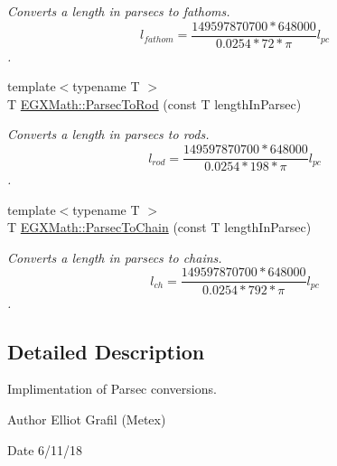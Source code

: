 \begin{DoxyCompactItemize}
\begin{DoxyCompactList}\small\item\em Converts a length in parsecs to fathoms. \[ l_{fathom}= \frac{149597870700 * 648000}{0.0254 * 72 * \pi} l_{pc} \]. \end{DoxyCompactList}\item 
{\footnotesize template$<$typename T $>$ }\\T \mbox{\hyperlink{group___e_g_x_math-_conversions-_length_conversions-_astronomical-_parsec-_surveyors_gae1b8ed339937e1c769e4617dbe1e70e1}{E\+G\+X\+Math\+::\+Parsec\+To\+Rod}} (const T length\+In\+Parsec)
\begin{DoxyCompactList}\small\item\em Converts a length in parsecs to rods. \[ l_{rod}= \frac{149597870700 * 648000}{0.0254 * 198 * \pi} l_{pc} \]. \end{DoxyCompactList}\item 
{\footnotesize template$<$typename T $>$ }\\T \mbox{\hyperlink{group___e_g_x_math-_conversions-_length_conversions-_astronomical-_parsec-_surveyors_gafe4318e1971a50fd899558ca0e9cf7c6}{E\+G\+X\+Math\+::\+Parsec\+To\+Chain}} (const T length\+In\+Parsec)
\begin{DoxyCompactList}\small\item\em Converts a length in parsecs to chains. \[ l_{ch}= \frac{149597870700 * 648000}{0.0254 * 792 * \pi} l_{pc} \]. \end{DoxyCompactList}\end{DoxyCompactItemize}


\subsection{Detailed Description}
Implimentation of Parsec conversions. 

\begin{DoxyAuthor}{Author}
Elliot Grafil (Metex) 
\end{DoxyAuthor}
\begin{DoxyDate}{Date}
6/11/18 
\end{DoxyDate}
